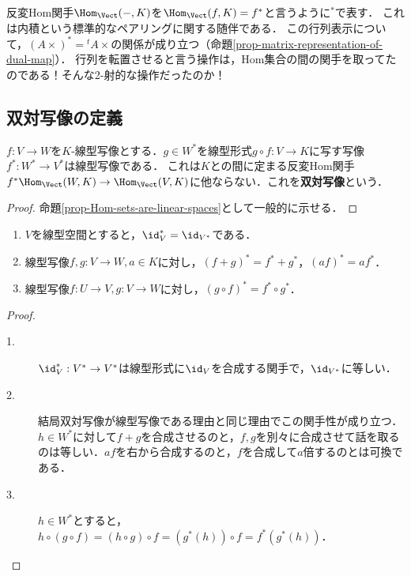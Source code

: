 \documentclass[uplatex, dvipdfmx]{jsreport}
\begin{document}
\begin{tcolorbox}[colframe=ForestGreen, colback=ForestGreen!10!white, breakable]
    反変Hom関手$\Hom_\Vect(-,K)$を$\Hom_\Vect(f,K)=f^*$と言うように${}^*$で表す．
    これは内積という標準的なペアリングに関する随伴である．
    この行列表示について，$(A\times)^*={}^t\!A\times$の関係が成り立つ（命題\ref{prop-matrix-representation-of-dual-map}）．
    行列を転置させると言う操作は，Hom集合の間の関手を取ってたのである！そんな2-射的な操作だったのか！
\end{tcolorbox}

\subsection{双対写像の定義}

\begin{proposition}
    $f:V\to W$を$K$-線型写像とする．$g\in W^*$を線型形式$g\circ f:V\to K$に写す写像$f^*:W^*\to V^*$は線型写像である．
    これは$K$との間に定まる反変Hom関手$f^*\Hom_\Vect(W,K)\to\Hom_\Vect(V,K)$に他ならない．これを\textbf{双対写像}という．
\end{proposition}
\begin{proof}
    命題\ref{prop-Hom-sets-are-linear-spaces}として一般的に示せる．
\end{proof}

\begin{proposition}\mbox{}\label{prop-Hom-K-is-contravariant}
    \begin{enumerate}
        \item $V$を線型空間とすると，$\id^*_V=\id_{V^*}$である．
        \item 線型写像$f,g:V\to W,a\in K$に対し，$(f+g)^*=f^*+g^*$，$(af)^*=af^*$．
        \item 線型写像$f:U\to V,g:V\to W$に対し，$(g\circ f)^*=f^*\circ g^*$．
    \end{enumerate}
\end{proposition}
\begin{proof}\mbox{}
    \begin{description}
        \item[1.] $\id^*_V:V^*\to V^*$は線型形式に$\id_V$を合成する関手で，$\id_{V^*}$に等しい．
        \item[2.] 結局双対写像が線型写像である理由と同じ理由でこの関手性が成り立つ．$h\in W^*$に対して$f+g$を合成させるのと，$f,g$を別々に合成させて話を取るのは等しい．$af$を右から合成するのと，$f$を合成して$a$倍するのとは可換である．
        \item[3.] $h\in W^*$とすると，$h\circ(g\circ f)=(h\circ g)\circ f=(g^*(h))\circ f=f^*(g^*(h))$．
    \end{description}
\end{proof}
\end{document}
